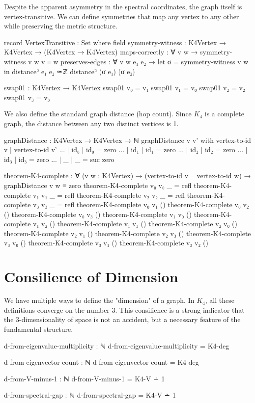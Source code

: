 \documentclass[11pt,a4paper]{book}
\begin{document}
Despite the apparent asymmetry in the spectral coordinates, the graph itself is vertex-transitive. We can define symmetries that map any vertex to any other while preserving the metric structure.

\begin{code}
record VertexTransitive : Set where
  field
    symmetry-witness : K4Vertex → K4Vertex → (K4Vertex → K4Vertex)
    maps-correctly : ∀ v w → symmetry-witness v w v ≡ w
    preserves-edges : ∀ v w e₁ e₂ → 
      let σ = symmetry-witness v w in
      distance² e₁ e₂ ≃ℤ distance² (σ e₁) (σ e₂)

swap01 : K4Vertex → K4Vertex
swap01 v₀ = v₁
swap01 v₁ = v₀
swap01 v₂ = v₂
swap01 v₃ = v₃

\end{code}

We also define the standard graph distance (hop count). Since $K_4$ is a complete graph, the distance between any two distinct vertices is 1.

\begin{code}
graphDistance : K4Vertex → K4Vertex → ℕ
graphDistance v v' with vertex-to-id v | vertex-to-id v'
... | id₀ | id₀ = zero
... | id₁ | id₁ = zero
... | id₂ | id₂ = zero
... | id₃ | id₃ = zero
... | _   | _   = suc zero

theorem-K4-complete : ∀ (v w : K4Vertex) → 
  (vertex-to-id v ≡ vertex-to-id w) → graphDistance v w ≡ zero
theorem-K4-complete v₀ v₀ _ = refl
theorem-K4-complete v₁ v₁ _ = refl
theorem-K4-complete v₂ v₂ _ = refl
theorem-K4-complete v₃ v₃ _ = refl
theorem-K4-complete v₀ v₁ ()
theorem-K4-complete v₀ v₂ ()
theorem-K4-complete v₀ v₃ ()
theorem-K4-complete v₁ v₀ ()
theorem-K4-complete v₁ v₂ ()
theorem-K4-complete v₁ v₃ ()
theorem-K4-complete v₂ v₀ ()
theorem-K4-complete v₂ v₁ ()
theorem-K4-complete v₂ v₃ ()
theorem-K4-complete v₃ v₀ ()
theorem-K4-complete v₃ v₁ ()
theorem-K4-complete v₃ v₂ ()
\end{code}

\section{Consilience of Dimension}

We have multiple ways to define the "dimension" of a graph. In $K_4$, all these definitions converge on the number 3. This consilience is a strong indicator that the 3-dimensionality of space is not an accident, but a necessary feature of the fundamental structure.

\begin{code}
d-from-eigenvalue-multiplicity : ℕ
d-from-eigenvalue-multiplicity = K4-deg

d-from-eigenvector-count : ℕ
d-from-eigenvector-count = K4-deg

d-from-V-minus-1 : ℕ
d-from-V-minus-1 = K4-V ∸ 1

d-from-spectral-gap : ℕ
d-from-spectral-gap = K4-V ∸ 1
\end{code}
\end{document}
